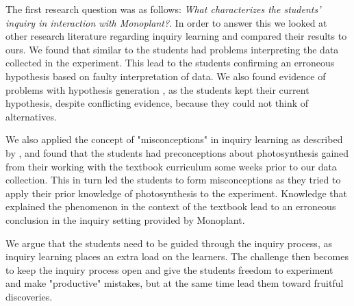 The first research question was as follows: \emph{What characterizes the students’ inquiry in interaction with Monoplant?}. In order to answer this we looked at other research literature regarding inquiry learning and compared their results to ours. We found that similar to \citeauthor{klahr1993heuristics} \citetext{\citeyear{klahr1993heuristics}, referenced in \citealp{de1998scientific}} the students had problems interpreting the data collected in the experiment. This lead to the students confirming an erroneous hypothesis based on faulty interpretation of data. We also found evidence of problems with hypothesis generation \citep{de1998scientific}, as the students kept their current hypothesis, despite conflicting evidence, because they could not think of alternatives. 

We also applied the concept of "misconceptions" in inquiry learning as described by \citet{gomez2008elementary,smith1994misconceptions}, and found that the students had preconceptions about photosynthesis gained from their working with the textbook curriculum some weeks prior to our data collection. This in turn led the students to form misconceptions as they tried to apply their prior knowledge of photosynthesis to the experiment. Knowledge that explained the phenomenon in the context of the textbook lead to an erroneous conclusion in the inquiry setting provided by Monoplant. %

We argue that the students need to be guided through the inquiry process, as inquiry learning places an extra load on the learners. The challenge then becomes to keep the inquiry process open and give the students freedom to experiment and make "productive" mistakes, but at the same time lead them toward fruitful discoveries. 



